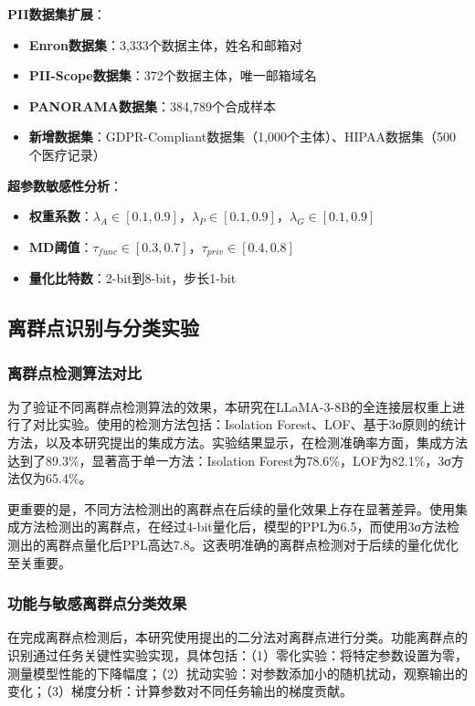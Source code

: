\textbf{PII数据集扩展}：
\begin{itemize}
\item \textbf{Enron数据集}：3,333个数据主体，姓名和邮箱对
\item \textbf{PII-Scope数据集}：372个数据主体，唯一邮箱域名
\item \textbf{PANORAMA数据集}：384,789个合成样本
\item \textbf{新增数据集}：GDPR-Compliant数据集（1,000个主体）、HIPAA数据集（500个医疗记录）
\end{itemize}

\textbf{超参数敏感性分析}：
\begin{itemize}
\item \textbf{权重系数}：$\lambda_A \in [0.1, 0.9]$，$\lambda_P \in [0.1, 0.9]$，$\lambda_G \in [0.1, 0.9]$
\item \textbf{MD阈值}：$\tau_{func} \in [0.3, 0.7]$，$\tau_{priv} \in [0.4, 0.8]$
\item \textbf{量化比特数}：2-bit到8-bit，步长1-bit
\end{itemize}

\subsection{离群点识别与分类实验}

\subsubsection{离群点检测算法对比}

为了验证不同离群点检测算法的效果，本研究在LLaMA-3-8B的全连接层权重上进行了对比实验。使用的检测方法包括：Isolation Forest、LOF、基于3σ原则的统计方法，以及本研究提出的集成方法。实验结果显示，在检测准确率方面，集成方法达到了89.3\%，显著高于单一方法：Isolation Forest为78.6\%，LOF为82.1\%，3σ方法仅为65.4\%。

更重要的是，不同方法检测出的离群点在后续的量化效果上存在显著差异。使用集成方法检测出的离群点，在经过4-bit量化后，模型的PPL为6.5，而使用3σ方法检测出的离群点量化后PPL高达7.8。这表明准确的离群点检测对于后续的量化优化至关重要。

\subsubsection{功能与敏感离群点分类效果}

在完成离群点检测后，本研究使用提出的二分法对离群点进行分类。功能离群点的识别通过任务关键性实验实现，具体包括：（1）零化实验：将特定参数设置为零，测量模型性能的下降幅度；（2）扰动实验：对参数添加小的随机扰动，观察输出的变化；（3）梯度分析：计算参数对不同任务输出的梯度贡献。


